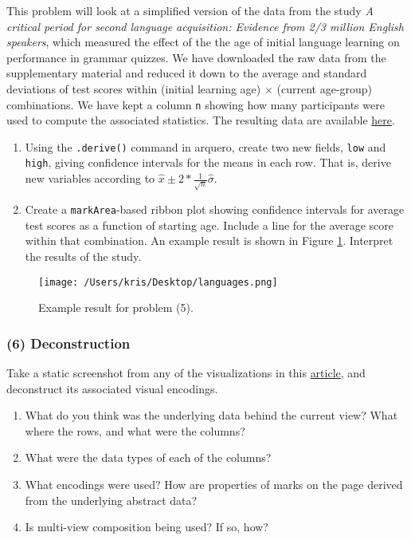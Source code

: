 \documentclass[
]{article}
\providecommand{\tightlist}{%
  \setlength{\itemsep}{0pt}\setlength{\parskip}{0pt}}
\begin{document}
This problem will look at a simplified version of the data from the
study \emph{A critical period for second language acquisition: Evidence
from 2/3 million English speakers}, which measured the effect of the the
age of initial language learning on performance in grammar quizzes. We
have downloaded the raw data from the supplementary material and reduced
it down to the average and standard deviations of test scores within
(initial learning age) \(\times\) (current age-group) combinations. We
have kept a column \texttt{n} showing how many participants were used to
compute the associated statistics. The resulting data are available
\href{https://uwmadison.box.com/shared/static/m53dea9w5ipczs3d7nqdnxqxx5ao501b.csv}{here}.

\begin{enumerate}
\def\labelenumi{\alph{enumi})}
\tightlist
\item
  Using the \texttt{.derive()} command in arquero, create two new
  fields, \texttt{low} and \texttt{high}, giving confidence intervals
  for the means in each row. That is, derive new variables according to
  \(\hat{x} \pm 2 * \frac{1}{\sqrt{n}}\hat{\sigma}\).
\item
  Create a \texttt{markArea}-based ribbon plot showing confidence
  intervals for average test scores as a function of starting age.
  Include a line for the average score within that combination. An
  example result is shown in Figure \ref{fig:5}. Interpret the results
  of the study.
\end{enumerate}

\begin{figure}
  \centering
  \texttt{[image: /Users/kris/Desktop/languages.png]}
  \caption{Example result for problem (5).}
  \label{fig:5}
\end{figure}

\hypertarget{deconstruction}{%
\subsubsection{(6) Deconstruction}\label{deconstruction}}

Take a static screenshot from any of the visualizations in this
\href{https://www.theguardian.com/us-news/ng-interactive/2017/dec/20/bussed-out-america-moves-homeless-people-country-study}{article},
and deconstruct its associated visual encodings.

\begin{enumerate}
\def\labelenumi{\alph{enumi})}
\tightlist
\item
  What do you think was the underlying data behind the current view?
  What where the rows, and what were the columns?
\item
  What were the data types of each of the columns?
\item
  What encodings were used? How are properties of marks on the page
  derived from the underlying abstract data?
\item
  Is multi-view composition being used? If so, how?
\end{enumerate}
\end{document}
